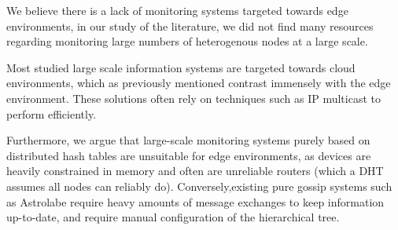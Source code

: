 We believe there is a lack of monitoring systems targeted towards edge environments, in our study of the literature, we did not find many resources regarding monitoring large numbers of heterogenous nodes at a large scale.

Most studied large scale information systems are targeted towards cloud environments, which as previously mentioned contrast immensely with the edge environment. These solutions often rely on techniques such as IP multicast \cite{massie2004ganglia} to perform efficiently.

Furthermore, we argue that large-scale monitoring systems purely based on distributed hash tables \cite{10.1145/1030194.1015509} are unsuitable for edge environments, as  devices are heavily constrained in memory and often are unreliable routers (which a DHT assumes all nodes can reliably do).  Conversely,existing pure gossip systems such as Astrolabe \cite{Renesse2003} require heavy amounts of message exchanges to keep information up-to-date, and require manual configuration of the hierarchical tree.

